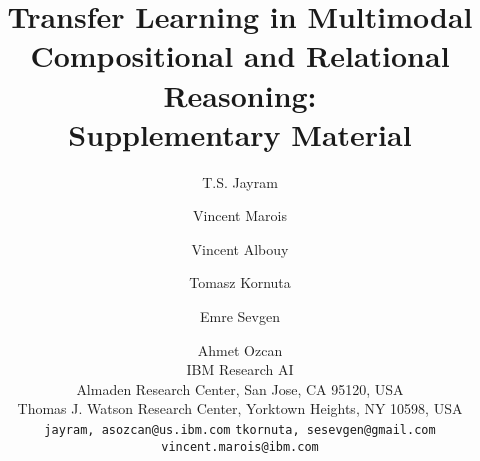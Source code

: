 \documentclass[10pt,letterpaper]{article}
\begin{document}
\title{Transfer Learning in Multimodal Compositional and Relational Reasoning:\\Supplementary Material}

\author{T.S. Jayram \and  Vincent Marois \and Vincent Albouy \and Tomasz Kornuta  \and Emre Sevgen \and Ahmet Ozcan\\
IBM Research AI\\
Almaden Research Center, San Jose, CA 95120, USA\\
Thomas J. Watson Research Center, Yorktown Heights, NY 10598, USA\\
{\tt\small {jayram,  asozcan}@us.ibm.com}
{\tt\small {tkornuta, sesevgen}@gmail.com}
{\tt\small vincent.marois@ibm.com}
}

\maketitle



\clearpage
{\small
	
	
}
\end{document}
